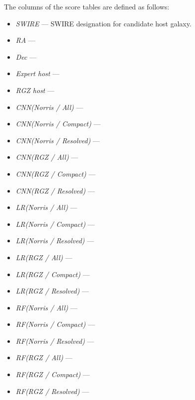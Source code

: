 \documentclass[fleqn,usenatbib,usedcolumn]{mnras}
\begin{document}
  The columns of the score tables are defined as follows:
  \begin{itemize}
    \item \emph{SWIRE} --- SWIRE designation for candidate host galaxy.
    \item \emph{RA} --- 
    \item \emph{Dec} --- 
    \item \emph{Expert host} --- 
    \item \emph{RGZ host} --- 
    \item \emph{CNN(Norris / All)} --- 
    \item \emph{CNN(Norris / Compact)} --- 
    \item \emph{CNN(Norris / Resolved)} --- 
    \item \emph{CNN(RGZ / All)} --- 
    \item \emph{CNN(RGZ / Compact)} --- 
    \item \emph{CNN(RGZ / Resolved)} --- 
    \item \emph{LR(Norris / All)} --- 
    \item \emph{LR(Norris / Compact)} --- 
    \item \emph{LR(Norris / Resolved)} --- 
    \item \emph{LR(RGZ / All)} --- 
    \item \emph{LR(RGZ / Compact)} --- 
    \item \emph{LR(RGZ / Resolved)} --- 
    \item \emph{RF(Norris / All)} --- 
    \item \emph{RF(Norris / Compact)} --- 
    \item \emph{RF(Norris / Resolved)} --- 
    \item \emph{RF(RGZ / All)} --- 
    \item \emph{RF(RGZ / Compact)} --- 
    \item \emph{RF(RGZ / Resolved)} --- 
  \end{itemize}
\end{document}
